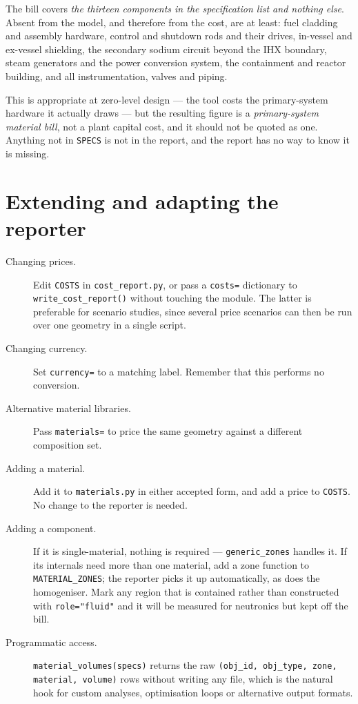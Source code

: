 \documentclass[9pt,a4paper]{extarticle}
\newcommand{\code}[1]{\texttt{\small #1}}
\newcommand{\file}[1]{\texttt{\small #1}}
\begin{document}
The bill covers \emph{the thirteen components in the specification list and
nothing else}. Absent from the model, and therefore from the cost, are at least:
fuel cladding and assembly hardware, control and shutdown rods and their
drives, in-vessel and ex-vessel shielding, the secondary sodium circuit beyond
the IHX boundary, steam generators and the power conversion system, the
containment and reactor building, and all instrumentation, valves and piping.

This is appropriate at zero-level design --- the tool costs the primary-system
hardware it actually draws --- but the resulting figure is a
\emph{primary-system material bill}, not a plant capital cost, and it should not
be quoted as one. Anything not in \code{SPECS} is not in the report, and the
report has no way to know it is missing.

\section{Extending and adapting the reporter}

\begin{description}
  \item[Changing prices.] Edit \code{COSTS} in \file{cost\_report.py}, or pass a
    \code{costs=} dictionary to \code{write\_cost\_report()} without touching the
    module. The latter is preferable for scenario studies, since several price
    scenarios can then be run over one geometry in a single script.
  \item[Changing currency.] Set \code{currency=} to a matching label. Remember
    that this performs no conversion.
  \item[Alternative material libraries.] Pass \code{materials=} to price the
    same geometry against a different composition set.
  \item[Adding a material.] Add it to \file{materials.py} in either accepted
    form, and add a price to \code{COSTS}. No change to the reporter is needed.
  \item[Adding a component.] If it is single-material, nothing is required ---
    \code{generic\_zones} handles it. If its internals need more than one
    material, add a zone function to \code{MATERIAL\_ZONES}; the reporter picks
    it up automatically, as does the homogeniser. Mark any region that is
    contained rather than constructed with \code{role="fluid"} and it will be
    measured for neutronics but kept off the bill.
  \item[Programmatic access.] \code{material\_volumes(specs)} returns the raw
    \code{(obj\_id, obj\_type, zone, material, volume)} rows without writing any
    file, which is the natural hook for custom analyses, optimisation loops or
    alternative output formats.
\end{description}
\end{document}

